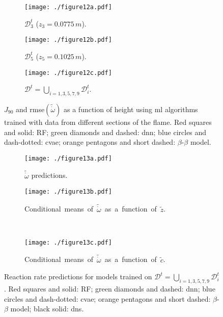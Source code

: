 \documentclass[review]{elsarticle}
\newcommand{\wt}[1]{\widetilde{#1}}
\begin{document}
\clearpage\newpage
\begin{figure}[!tbp]%
  \centering%
  \begin{subfigure}[t]{\textwidth}%
    \texttt{[image: ./figure12a.pdf]}%
    \caption{$\mathcal{D}_3^t$ ($z_3=0.0775\,\unit{m}$).}\label{fig:gen_3}%
  \end{subfigure}\hfill%
  \begin{subfigure}[t]{\textwidth}%
    \texttt{[image: ./figure12b.pdf]}%
    \caption{$\mathcal{D}_5^t$ ($z_5=0.1025\,\unit{m}$).}\label{fig:gen_5}%
  \end{subfigure}\hfill%
  \begin{subfigure}[t]{\textwidth}%
    \texttt{[image: ./figure12c.pdf]}%
    \caption{$\mathcal{D}^t = \bigcup\limits_{i=1, 3, 5, 7, 9} \mathcal{D}_i^t$.}\label{fig:gen_skip}%
  \end{subfigure}%
  \caption{$J_{90}$ and \gls{rmse}$(\wt{\dot{\omega}})$ as a function of
    height using \gls{ml} algorithms trained with data from different
    sections of the flame. Red squares and solid: RF; green diamonds
    and dashed: \gls{dnn}; blue circles and dash-dotted: \gls{cvae}; orange
    pentagons and short dashed: $\beta$-$\beta$ model.}\label{fig:gen}%
\end{figure}%

\clearpage\newpage
\begin{figure}[!tbp]%
  \centering%
  \begin{subfigure}[t]{0.48\textwidth}%
    \texttt{[image: ./figure13a.pdf]}%
    \caption{$\wt{\dot{\omega}}$ predictions.}%
  \end{subfigure}\hfill%
  \begin{subfigure}[t]{0.48\textwidth}%
    \texttt{[image: ./figure13b.pdf]}%
    \caption{\mbox{Conditional means of $\wt{\dot{\omega}}$ as a function of $\wt{z}$.}}%
  \end{subfigure}\\[0.2cm]%
  \begin{subfigure}[t]{0.48\textwidth}%
    \texttt{[image: ./figure13c.pdf]}%
    \caption{\mbox{Conditional means of $\wt{\dot{\omega}}$ as a function of $\wt{c}$.}}%
  \end{subfigure}%
  \caption{Reaction rate predictions for models trained on $\mathcal{D}^t = \bigcup\limits_{i=1, 3, 5, 7, 9} \mathcal{D}_i^t$. Red squares and solid: RF; green diamonds and dashed: \gls{dnn}; blue circles and dash-dotted: \gls{cvae}; orange pentagons and short dashed: $\beta$-$\beta$ model; black solid: \gls{dns}.}\label{fig:convolution_skip}%
\end{figure}%
\end{document}
